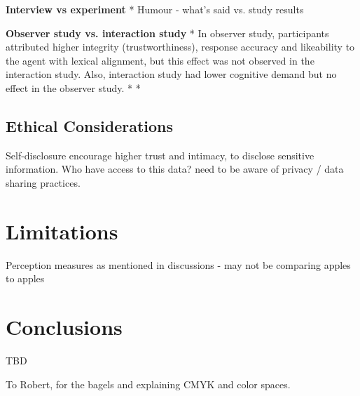 \documentclass[sigconf,screen,review, anonymous]{acmart}
\newcommand{\cmt}[1]{}%
\begin{document}
\textbf{Interview vs experiment}
* Humour - what's said vs. study results

\textbf{Observer study vs. interaction study}
* In observer study, participants attributed higher integrity (trustworthiness), response accuracy and likeability to the agent with lexical alignment, but this effect was not observed in the interaction study. Also, interaction study had lower cognitive demand but no effect in the observer study. \cite{linnemann2018can}\cmt{[15]}
* \cite{zhu2022effects}\cmt{[26]}
* \cite{cox2022does}\cmt{[27]}

\subsection{Ethical Considerations}

Self-disclosure encourage higher trust and intimacy, to disclose sensitive information. Who have access to this data? need to be aware of privacy / data sharing practices. \cite{lee2020hear}\cmt{[23]}

\section{Limitations}

Perception measures as mentioned in discussions - may not be comparing apples to apples

\section{Conclusions}

TBD


\begin{acks}
To Robert, for the bagels and explaining CMYK and color spaces.
\end{acks}




\appendix
\end{document}
